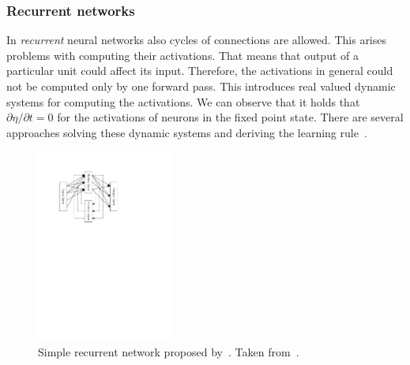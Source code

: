 \subsubsection{Recurrent networks}
\label{sec:theory-recurrent} 

In \emph{recurrent} neural networks also cycles of connections are allowed. This arises problems with computing their activations. That means that output of a particular unit could affect its input. Therefore, the activations in general could not be computed only by one forward pass. This introduces real valued dynamic systems for computing the activations. We can observe that it holds that $\partial\eta / \partial t = 0$ for the activations of neurons in the fixed point state. There are several approaches solving these dynamic systems and deriving the learning rule~\citep{pineda1987generalization, pearlmutter1989learning, williams1989learning, elman1990finding, haykin1994neural}. 

\begin{figure}[H]
  \centering
  \includegraphics[width=0.4\textwidth]{img/models-recurrent.pdf}    
  \caption{Simple recurrent network proposed by~\citet{elman1990finding}. Taken from~\citet{haykin1994neural}.} 
  \label{fig:theory-recurrent}
\end{figure}

